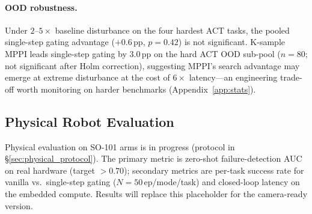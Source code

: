 \paragraph{OOD robustness.} Under $2$--$5{\times}$ baseline disturbance on the four hardest ACT tasks, the pooled single-step gating advantage ($+0.6$\,pp, $p{=}0.42$) is not significant. K-sample MPPI leads single-step gating by $3.0$\,pp on the hard ACT OOD sub-pool ($n{=}80$; not significant after Holm correction), suggesting MPPI's search advantage may emerge at extreme disturbance at the cost of $6{\times}$ latency---an engineering trade-off worth monitoring on harder benchmarks (Appendix~\ref{app:stats}).

\subsection{Physical Robot Evaluation}
\label{sec:physical_results}

{\color{blue}
Physical evaluation on SO-101 arms is in progress (protocol in \S\ref{sec:physical_protocol}). The primary metric is zero-shot failure-detection AUC on real hardware (target ${>}0.70$); secondary metrics are per-task success rate for vanilla vs.\ single-step gating ($N{=}50$\,ep/mode/task) and closed-loop latency on the embedded compute. Results will replace this placeholder for the camera-ready version.
}

